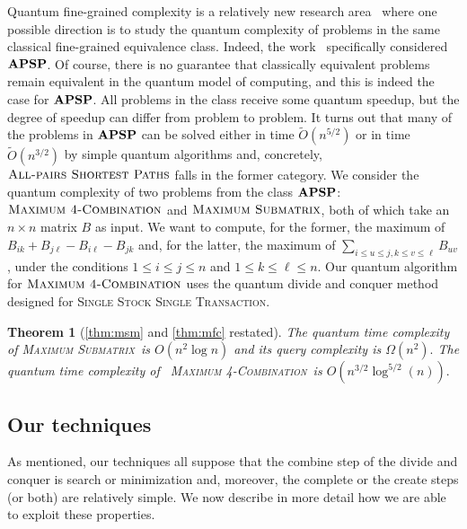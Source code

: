 \documentclass[12pt]{article}
\newcommand{\MaxSubMf}{\textsc{Maximum Submatrix}}
\newcommand{\MaxFourCf}{\textsc{Maximum 4-Combination}}
\newcommand{\SSSTf}{\textsc{Single Stock Single Transaction}}
\newcommand{\APSPf}{\textsc{All-pairs Shortest Paths}}
\newcommand{\APSPc}{\bf{APSP}}
\newtheorem*{rtheorem}{Theorem}
\theoremstyle{definition}
\begin{document}
Quantum fine-grained complexity is a relatively new research area~\cite{ACLWZ20, BPS21, BLPS22} where one possible direction is to study the quantum complexity of problems in the same classical fine-grained equivalence class.
Indeed, the work~\cite{ABLPS22} specifically considered $\APSPc$. 
Of course, there is no guarantee that classically equivalent problems remain equivalent in the quantum model of computing, and this is indeed the case for $\APSPc$. All problems in the class receive some quantum speedup, but the degree of speedup can differ from problem to problem. It turns out that many of the problems in $\APSPc$ can be solved either in time $\widetilde{O}(n^{5/2})$ or in time $\widetilde{O}(n^{3/2})$ by simple quantum algorithms and, concretely, $\APSPf$ falls in the former category. 
We consider the quantum complexity of two problems from the class $\APSPc$:
$\MaxFourCf$ and $\MaxSubMf$, both of which take an $n \times n$ matrix $B$ as input.
We want to compute, for the former, the maximum of $ B_{ik} + B_{j \ell} - B_{i \ell} - B_{jk} $ and, for the latter, the maximum of $\sum_{i \leq u \leq j, k \leq v \leq \ell} B_{uv}$, under the conditions $1 \leq i  \leq j \leq n$ and $1 \leq k  \leq \ell \leq n$. Our quantum algorithm for $\MaxFourCf$ uses the quantum divide and conquer method designed for \SSSTf.

\begin{rtheorem}[\cref{thm:msm} and \cref{thm:mfc} {\normalfont restated}]
The quantum time complexity of \MaxSubMf\ is $O(n^{2} \log n)$ and its query complexity is $\Omega(n^2).$
The quantum time complexity of \ \MaxFourCf ~is ${O}(n^{3/2} \log^{5/2} (n)).$
\end{rtheorem}




\subsection{Our techniques} 
As mentioned, our techniques all suppose that the combine step of the divide and conquer is search or minimization and, moreover, the complete or the create steps (or both) are relatively simple.
We now describe in more detail how we are able to exploit these properties.
\end{document}
